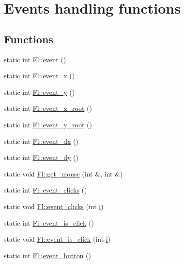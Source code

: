 \hypertarget{group__fl__events}{}\section{Events handling functions}
\label{group__fl__events}
\subsection*{Functions}
\begin{DoxyCompactItemize}
\item 
static int \hyperlink{group__fl__events_gac7595e274aaebaa23982125a1363d13f}{Fl\+::event} ()
\item 
static int \hyperlink{group__fl__events_ga91585fcbaa1e79f7452fd2d16a82136e}{Fl\+::event\+\_\+x} ()
\item 
static int \hyperlink{group__fl__events_ga192a0c5a37f33b9d117a69f20977c2a1}{Fl\+::event\+\_\+y} ()
\item 
static int \hyperlink{group__fl__events_ga4c40bd0d2960354c9778fdb65a2b720d}{Fl\+::event\+\_\+x\+\_\+root} ()
\item 
static int \hyperlink{group__fl__events_ga9801003f911eae0e49bf52b875dcaaa5}{Fl\+::event\+\_\+y\+\_\+root} ()
\item 
static int \hyperlink{group__fl__events_gadd50231ad95aaf23a23e9db42cccb42e}{Fl\+::event\+\_\+dx} ()
\item 
static int \hyperlink{group__fl__events_ga4704bd4e93b6471321d6ac84b0df97e5}{Fl\+::event\+\_\+dy} ()
\item 
static void \hyperlink{group__fl__events_ga79a94c0ac0f71557ef4b6dc7b8d863db}{Fl\+::get\+\_\+mouse} (int \&, int \&)
\item 
static int \hyperlink{group__fl__events_gafa31b53b34bd43ee107806a3bbc640d1}{Fl\+::event\+\_\+clicks} ()
\item 
static void \hyperlink{group__fl__events_ga0531622eb47fab712faedd43eab886d9}{Fl\+::event\+\_\+clicks} (int \hyperlink{forms_8_h_acb559820d9ca11295b4500f179ef6392}{i})
\item 
static int \hyperlink{group__fl__events_gae4f3bafeb9fbae98c3b7cc6f5326e582}{Fl\+::event\+\_\+is\+\_\+click} ()
\item 
static void \hyperlink{group__fl__events_ga08ba811a19462788094768ed98798120}{Fl\+::event\+\_\+is\+\_\+click} (int \hyperlink{forms_8_h_acb559820d9ca11295b4500f179ef6392}{i})
\item 
static int \hyperlink{group__fl__events_ga7ae6d99ceb1a2afb8a1dc4455ac941cd}{Fl\+::event\+\_\+button} ()

\end{DoxyCompactItemize}
